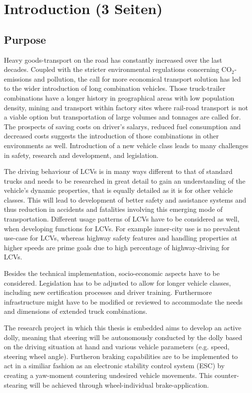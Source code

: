\documentclass[ExampleMasters.tex]{subfiles}
\begin{document}
\clearpage	
\chapter{Introduction (3 Seiten)}
\label{chap:introduction}

\section{Purpose}
\label{sec:purpose}
Heavy goods-transport on the road has constantly increased over the last decades. Coupled with the stricter environmental regulations concerning CO$_{2}$-emissions and pollution, the call for more economical transport solution has led to the wider introduction of long combination vehicles. Those truck-trailer combinations have a longer history in geographical areas with low population density, mining and transport within factory sites where rail-road transport is not a viable option but transportation of large volumes and tonnages are called for. The prospects of saving costs on driver's salarys, reduced fuel consumption and decreased costs suggests the introduction of those combinations in other environments as well. Introduction of a new vehicle class leads to many challenges in safety, research and development, and legislation. 

The driving behaviour of LCVs is in many ways different to that of standard trucks and needs to be researched in great detail to gain an understanding of the vehicle's dynamic properties, that is equally detailed as it is for other vehicle classes. This will lead to development of better safety and assistance systems and thus reduction in accidents and fatalities involving this emerging mode of transportation. Different usage patterns of LCVs have to be considered as well, when developing functions for LCVs. For example inner-city use is no prevalent use-case for LCVs, whereas highway safety features and handling properties at higher speeds are prime goals due to high percentage of highway-driving for LCVs.

Besides the technical implementation, socio-economic aspects have to be considered. Legislation has to be adjusted to allow for longer vehicle classes, including new certification processes and driver training. Furthermore infrastructure might have to be modified or reviewed to accommodate the needs and dimensions of extended truck combinations.

The research project in which this thesis is embedded aims to develop an active dolly, meaning that steering will be autonomously conducted by the dolly based on the driving situation at hand and various vehicle parameters (e.g. speed, steering wheel angle). Furtheron braking capabilities are to be implemented to act in a similiar fashion as an electronic stability control system (ESC) by creating a yaw-moment countering undesired vehicle movements. This counter-stearing will be achieved through wheel-individual brake-application. 
\end{document}
